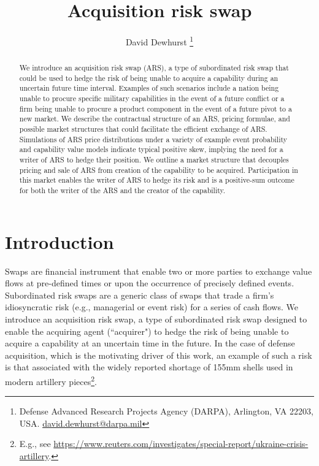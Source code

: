 \documentclass{article}
\title{Acquisition risk swap}
\author{David Dewhurst
    \thanks{Defense Advanced Research Projects Agency (DARPA), 
    Arlington, VA 22203, USA. \href{david.dewhurst@darpa.mil}{david.dewhurst@darpa.mil}}}
\begin{document}
\maketitle

\begin{abstract}
We introduce an acquisition risk swap (ARS), a type of subordinated risk swap that could be used to hedge the risk of being unable to acquire a capability during an uncertain future time interval. 
Examples of such scenarios include a nation being unable to procure specific military capabilities in the event of a future conflict or a firm being unable to procure a product component in the event of a future pivot to a new market.
We describe the contractual structure of an ARS, pricing formulae, and possible market structures that could facilitate the efficient exchange of ARS. 
Simulations of ARS price distributions under a variety of example event probability and capability value models indicate typical positive skew, implying the need for a writer of ARS to hedge their position. 
We outline a market structure that decouples pricing and sale of ARS from creation of the capability to be acquired. Participation in this market enables the writer of ARS to hedge its risk and is a positive-sum outcome for both the writer of the ARS and the creator of the capability.
\end{abstract}

\section{Introduction}
Swaps are financial instrument that enable two or more parties to exchange value flows at pre-defined times or upon the occurrence of precisely defined events.
Subordinated risk swaps are a generic class of swaps that trade a firm's idiosyncratic risk (e.g., managerial or event risk) for a series of cash flows.
We introduce an acquisition risk swap, a type of subordinated risk swap designed to enable the acquiring agent (``acquirer") to hedge the risk of being unable to acquire a capability at an uncertain time in the future.
In the case of defense acquisition, which is the motivating driver of this work, an example of such a risk is that associated with the widely reported shortage of 155mm shells used in modern artillery pieces\footnote{
E.g., see \href{https://www.reuters.com/investigates/special-report/ukraine-crisis-artillery}{https://www.reuters.com/investigates/special-report/ukraine-crisis-artillery}.
}.
\end{document}
